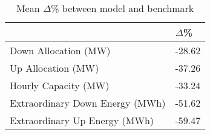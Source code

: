 \begin{table}[H] 
    \caption{Mean $\Delta$\% between model and benchmark\label{model_vs_bench_perc}}
    \begin{tabularx}{\textwidth}{CC}
    \toprule
    & \textbf{$\Delta$\%} \\
    

    \midrule
            Down Allocation (MW)	        & -28.62 \\
            Up Allocation (MW)              & -37.26 \\
            Hourly Capacity (MW)	        & -33.24 \\
            Extraordinary Down Energy (MWh)	& -51.62 \\
            Extraordinary Up Energy (MWh)	& -59.47 \\
    \bottomrule
    \end{tabularx}
\end{table}


